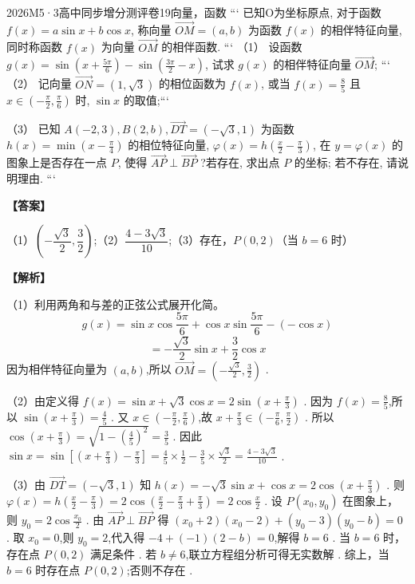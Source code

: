 \documentclass{exam-zh}
\newenvironment{answer}{\par\vspace{0.5em}\noindent\textbf{【答案】}\par}{\par\vspace{1em}}
\newenvironment{solutions}{\par\vspace{0.5em}\noindent\textbf{【解析】}\par}{\par\vspace{1em}}\usepackage{lastpage}
\begin{document}

\begin{question}{2026}{M}{5·3高中同步增分测评卷}{19}{向量，函数}
```
已知O为坐标原点, 对于函数 $f(x)=a \sin x+b \cos x$, 称向量 $\overrightarrow{O M}=(a, b)$ 为函数 $f(x)$ 的相伴特征向量, 同时称函数 $f(x)$ 为向量 $\overrightarrow{O M}$ 的相伴函数.
```
（1） 设函数 $g(x)=\sin \left(x+\frac{5 \pi}{6}\right)-\sin \left(\frac{3 \pi}{2}-x\right)$, 试求 $g(x)$ 的相伴特征向量 $\overrightarrow{O M}$;
```
（2） 记向量 $\overrightarrow{O N}=(1, \sqrt{3})$ 的相位函数为 $f(x)$, 或当 $f(x)=\frac{8}{5}$ 且 $x \in\left(-\frac{\pi}{2}, \frac{\pi}{6}\right)$ 时, $\sin x$ 的取值;```

（3） 已知 $A(-2,3), B(2, b), \overrightarrow{D T}=(-\sqrt{3}, 1)$ 为函数 $h(x)=\min \left(x-\frac{\pi}{4}\right)$ 的相位特征向量, $\varphi(x)=h\left(\frac{x}{2}-\frac{\pi}{3}\right)$, 在 $y=\varphi(x)$ 的图象上是否存在一点 $P$, 使得 $\overrightarrow{A P} \perp \overrightarrow{B P}$ ?若存在, 求出点 $P$ 的坐标; 若不存在, 请说明理由.
```
\end{question}

\begin{answer}
（1）$\boxed{\left(-\dfrac{\sqrt{3}}{2}, \dfrac{3}{2}\right)}$;（2）$\boxed{\dfrac{4-3\sqrt{3}}{10}}$;（3）存在，$\boxed{P(0,2)}$（当 $b=6$ 时）
\end{answer}

\begin{solutions}
（1）利用两角和与差的正弦公式展开化简。
$$
g(x)=\sin x\cos\frac{5\pi}{6}+\cos x\sin\frac{5\pi}{6}-(-\cos x)
$$
$$
=-\frac{\sqrt{3}}{2}\sin x+\frac{3}{2}\cos x
$$
因为相伴特征向量为 $(a,b)$,所以 $\overrightarrow{OM}=\left(-\frac{\sqrt{3}}{2}, \frac{3}{2}\right)$ .

（2）由定义得 $f(x)=\sin x+\sqrt{3}\cos x=2\sin\left(x+\frac{\pi}{3}\right)$ .
因为 $f(x)=\frac{8}{5}$,所以 $\sin\left(x+\frac{\pi}{3}\right)=\frac{4}{5}$ .
又 $x\in\left(-\frac{\pi}{2}, \frac{\pi}{6}\right)$,故 $x+\frac{\pi}{3}\in\left(-\frac{\pi}{6}, \frac{\pi}{2}\right)$ .
所以 $\cos\left(x+\frac{\pi}{3}\right)=\sqrt{1-\left(\frac{4}{5}\right)^2}=\frac{3}{5}$ .
因此 $\sin x=\sin\left[\left(x+\frac{\pi}{3}\right)-\frac{\pi}{3}\right]=\frac{4}{5}\times\frac{1}{2}-\frac{3}{5}\times\frac{\sqrt{3}}{2}=\frac{4-3\sqrt{3}}{10}$ .

（3）由 $\overrightarrow{DT}=(-\sqrt{3},1)$ 知 $h(x)=-\sqrt{3}\sin x+\cos x=2\cos\left(x+\frac{\pi}{3}\right)$ .
则 $\varphi(x)=h\left(\frac{x}{2}-\frac{\pi}{3}\right)=2\cos\left(\frac{x}{2}-\frac{\pi}{3}+\frac{\pi}{3}\right)=2\cos\frac{x}{2}$ .
设 $P(x_0,y_0)$ 在图象上，则 $y_0=2\cos\frac{x_0}{2}$ .
由 $\overrightarrow{AP}\perp\overrightarrow{BP}$ 得 $(x_0+2)(x_0-2)+(y_0-3)(y_0-b)=0$ .
取 $x_0=0$,则 $y_0=2$,代入得 $-4+(-1)(2-b)=0$,解得 $b=6$ .
当 $b=6$ 时，存在点 $P(0,2)$ 满足条件 .
若 $b\neq 6$,联立方程组分析可得无实数解 .
综上，当 $b=6$ 时存在点 $P(0,2)$;否则不存在 .
\end{solutions}
\end{document}
